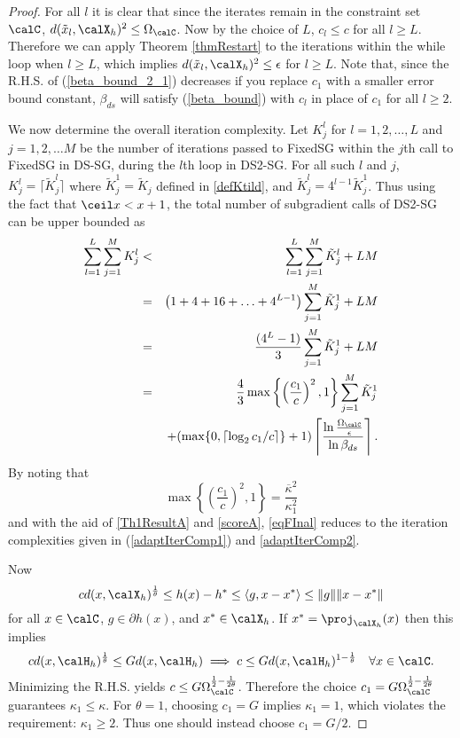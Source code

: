\begin{proof}
For all $l$ it is clear that since the iterates remain in the constraint set $\calC$,  $d(\tilde{x}_l,\calX_h)^2\leq \Omega_{\calC}$. Now by the choice of $L$, $c_l\leq c$ for all $l\geq L$. Therefore we can apply Theorem \ref{thmRestart} to the iterations within the while loop when $l\geq L$, which implies $d(\tilde{x}_l,\calX_h)^2\leq\epsilon$ for $l\geq L$. Note that, since the R.H.S. of (\ref{beta_bound_2_1}) decreases if you replace $c_1$ with a smaller error bound constant, $\beta_{ds}$ will satisfy (\ref{beta_bound}) with $c_l$ in place of $c_1$ for all $l\geq 2$. 

   We now determine the overall iteration complexity. Let $K_j^l$ for $l=1,2,\ldots, L$ and $j=1,2,\ldots M$ be the number of iterations passed to FixedSG within the $j$th call to FixedSG in DS-SG, during the $l$th loop in DS2-SG. For all such $l$ and $j$, $K_j^l = \lceil\tilde{K}_j^l\rceil$ where $\tilde{K}_j^1=\tilde{K}_j$ defined in \eqref{defKtild}, and $\tilde{K}_j^l = 4^{l-1}\tilde{K}_j^1$. 
  Thus using the fact that $\ceil x< x+1$, the total number of subgradient calls of DS2-SG can be upper bounded as
  \begin{eqnarray}
    \sum_{l=1}^L\sum_{j=1}^M K_j^l
  	&<&
    \sum_{l=1}^L\sum_{j=1}^M\tilde{K}_j^l +  LM
  	\nonumber\\
  	&=&
  	\left(1+4+16+\ldots +4^{L-1}\right)\sum_{j=1}^M\tilde{K}_j^1+  LM
  	\nonumber\\
  	&=&
  	\frac{(4^L-1)}{3}\sum_{j=1}^M\tilde{K}_j^1+LM
  	\nonumber\\
  	&=&
  	\frac{4}{3}
  	\max\left\{\left(\frac{c_1}{c}\right)^2,1\right\}
  	\sum_{j=1}^M\tilde{K}_j^1
  	\nonumber\\
  	&&+(\max\{0,\lceil\log_2 c_1/c\rceil\}+1)
  	\left\lceil\frac{\ln\frac{\Omega_{\calC}}{\epsilon}}{\ln\beta_{ds}}\right\rceil
  	.\label{eqFInal}
  \end{eqnarray}
By noting that 
$$
  	\max\left\{\left(\frac{c_1}{c}\right)^2,1\right\}
  	=
\frac{\overline{\kappa}^2}{\kappa_1^2}
 $$
 and with the aid of \eqref{Th1ResultA} and \eqref{scoreA}, \eqref{eqFInal} reduces to the iteration complexities given in (\ref{adaptIterComp1}) and \eqref{adaptIterComp2}.

 Now $$
 c d(x,\calX_h)^{\frac{1}{\theta}}
 \leq h(x)-h^*\leq \langle g,x-x^*\rangle\leq \|g\|\|x-x^*\|
 $$
 for all $x\in\calC$, $g\in\partial h(x)$, and $x^*\in\calX_h$. If $x^*=\proj_{\calX_h}(x)$ then this implies
 $$
 c d(x,\calH_h)^{\frac{1}{\theta}}\leq Gd(x,\calH_h)\implies c\leq Gd(x,\calH_h)^{1-\frac{1}{\theta}}\quad\forall x\in\calC.
 $$
 Minimizing the R.H.S. yields $c\leq G\Omega_{\calC}^{\frac{1}{2}-\frac{1}{2\theta}}$.
 Therefore the choice $c_1=G\Omega_{\calC}^{\frac{1}{2}-\frac{1}{2\theta}}$ guarantees $\kappa_1\leq\kappa$. 
For $\theta=1$, choosing $c_1=G$ implies $\kappa_1=1$, which violates the requirement: $\kappa_1\geq 2$. Thus one should instead choose $c_1=G/2$. 
\end{proof}